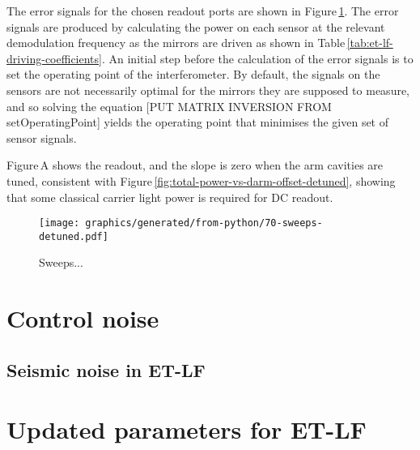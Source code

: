The error signals for the chosen readout ports are shown in Figure\,\ref{fig:sweeps-et-lf}. The error signals are produced by calculating the power on each sensor at the relevant demodulation frequency as the mirrors are driven as shown in Table\,\ref{tab:et-lf-driving-coefficients}. An initial step before the calculation of the error signals is to set the operating point of the interferometer. By default, the signals on the sensors are not necessarily optimal for the mirrors they are supposed to measure, and so solving the equation
[PUT MATRIX INVERSION FROM setOperatingPoint]
yields the operating point that minimises the given set of sensor signals.

Figure\,A shows the \ASDC{} readout, and the slope is zero when the arm cavities are tuned, consistent with Figure\,\ref{fig:total-power-vs-darm-offset-detuned}, showing that some classical carrier light power is required for \gls{DC} readout.

\begin{figure}
  \centering
  \texttt{[image: graphics/generated/from-python/70-sweeps-detuned.pdf]}
  \caption[Sweeps through the zero-crossings of the chosen error signals in ET-LF]{\label{fig:sweeps-et-lf}Sweeps...}
\end{figure}

\section{Control noise}

\subsection{Seismic noise in ET-LF}

\section{Updated parameters for ET-LF}

